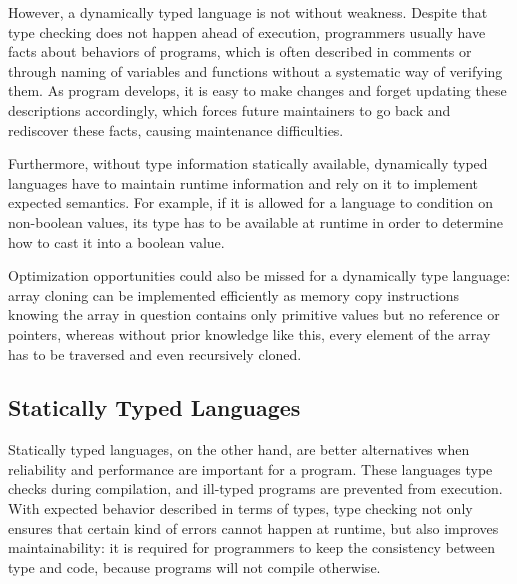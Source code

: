 
However, a dynamically typed language is not without weakness.
Despite that type checking does not happen ahead of execution,
programmers usually have facts about behaviors of programs,
which is often described in comments or through naming of variables and functions without a systematic way of verifying them.
As program develops, it is easy to make changes and forget updating these descriptions accordingly, which forces future maintainers to go back and rediscover these facts, causing maintenance difficulties.

Furthermore, without type information statically available,
dynamically typed languages have to maintain runtime information and rely on it to implement expected semantics. For example, if it is allowed for a language to condition on non-boolean values, its type has to be available at runtime in order to determine how to cast it into a boolean value.

Optimization opportunities could also be missed for a dynamically type language: 
array cloning can be implemented efficiently as memory copy instructions knowing the array in question contains only primitive values but no reference or pointers, whereas without prior knowledge like this, every element of the array has to be traversed and even recursively cloned.

\subsection{Statically Typed Languages}

Statically typed languages, on the other hand, are better alternatives
when reliability and performance are important for a program.
These languages type checks during compilation, and ill-typed programs are prevented from execution.
With expected behavior described in terms of types, type checking not only ensures that certain kind of errors cannot happen at runtime, but also improves maintainability: it is required for programmers to keep the consistency between type and code, because programs will not compile otherwise.

